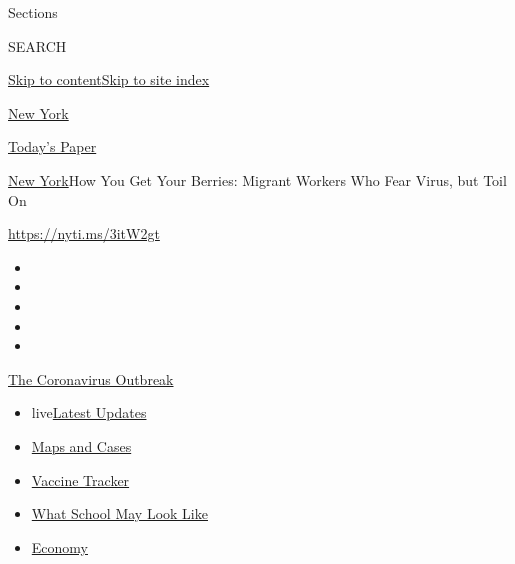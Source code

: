 Sections

SEARCH

\protect\hyperlink{site-content}{Skip to
content}\protect\hyperlink{site-index}{Skip to site index}

\href{https://www.nytimes3xbfgragh.onion/section/nyregion}{New York}

\href{https://myaccount.nytimes3xbfgragh.onion/auth/login?response_type=cookie\&client_id=vi}{}

\href{https://www.nytimes3xbfgragh.onion/section/todayspaper}{Today's
Paper}

\href{/section/nyregion}{New York}\textbar{}How You Get Your Berries:
Migrant Workers Who Fear Virus, but Toil On

\url{https://nyti.ms/3itW2gt}

\begin{itemize}
\item
\item
\item
\item
\item
\end{itemize}

\href{https://www.nytimes3xbfgragh.onion/news-event/coronavirus?action=click\&pgtype=Article\&state=default\&region=TOP_BANNER\&context=storylines_menu}{The
Coronavirus Outbreak}

\begin{itemize}
\tightlist
\item
  live\href{https://www.nytimes3xbfgragh.onion/2020/08/01/world/coronavirus-covid-19.html?action=click\&pgtype=Article\&state=default\&region=TOP_BANNER\&context=storylines_menu}{Latest
  Updates}
\item
  \href{https://www.nytimes3xbfgragh.onion/interactive/2020/us/coronavirus-us-cases.html?action=click\&pgtype=Article\&state=default\&region=TOP_BANNER\&context=storylines_menu}{Maps
  and Cases}
\item
  \href{https://www.nytimes3xbfgragh.onion/interactive/2020/science/coronavirus-vaccine-tracker.html?action=click\&pgtype=Article\&state=default\&region=TOP_BANNER\&context=storylines_menu}{Vaccine
  Tracker}
\item
  \href{https://www.nytimes3xbfgragh.onion/interactive/2020/07/29/us/schools-reopening-coronavirus.html?action=click\&pgtype=Article\&state=default\&region=TOP_BANNER\&context=storylines_menu}{What
  School May Look Like}
\item
  \href{https://www.nytimes3xbfgragh.onion/live/2020/07/31/business/stock-market-today-coronavirus?action=click\&pgtype=Article\&state=default\&region=TOP_BANNER\&context=storylines_menu}{Economy}
\end{itemize}

